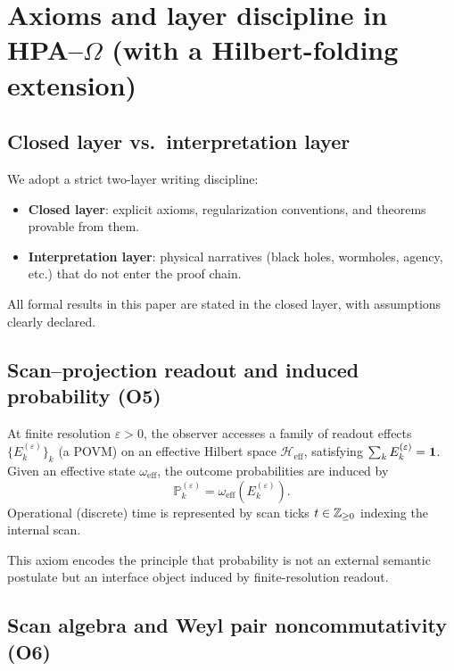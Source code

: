 
\section{Axioms and layer discipline in \texorpdfstring{HPA--$\Omega$}{HPA--Omega} (with a Hilbert-folding extension)}
\label{sec:axioms}

\subsection{Closed layer vs.\ interpretation layer}
\label{sec:layers}

We adopt a strict two-layer writing discipline:
\begin{itemize}
\item \textbf{Closed layer}: explicit axioms, regularization conventions, and theorems provable from them.
\item \textbf{Interpretation layer}: physical narratives (black holes, wormholes, agency, etc.) that do not enter the proof chain.
\end{itemize}
All formal results in this paper are stated in the closed layer, with assumptions clearly declared.

\subsection{Scan--projection readout and induced probability (O5)}
\label{sec:axiom_O5}

\begin{axiom}
\label{ax:O5}
At finite resolution $\varepsilon>0$, the observer accesses a family of readout effects $\{E_k^{(\varepsilon)}\}_k$ (a POVM) on an effective Hilbert space $\mathcal{H}_{\mathrm{eff}}$, satisfying $\sum_k E_k^{(\varepsilon)}=\mathbf{1}$.
Given an effective state $\omega_{\mathrm{eff}}$, the outcome probabilities are induced by
\[
\mathbb{P}_k^{(\varepsilon)}=\omega_{\mathrm{eff}}\!\left(E_k^{(\varepsilon)}\right).
\]
Operational (discrete) time is represented by scan ticks $t\in\mathbb{Z}_{\ge 0}$ indexing the internal scan.
\end{axiom}

This axiom encodes the principle that probability is not an external semantic postulate but an interface object induced by finite-resolution readout.

\subsection{Scan algebra and Weyl pair noncommutativity (O6)}
\label{sec:axiom_O6}

